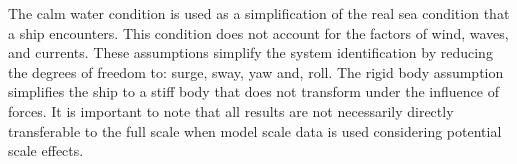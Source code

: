 %
%
%

The calm water condition is used as a simplification of the real sea condition that a ship encounters. This condition does not account for the factors of wind, waves, and currents. These assumptions simplify the system identification by reducing the degrees of freedom to: surge, sway, yaw and, roll. 
The rigid body assumption simplifies the ship to a stiff body that does not transform under the influence of forces. 
It is important to note that all results are not necessarily directly transferable to the full scale when model scale data is used considering potential scale effects. 

